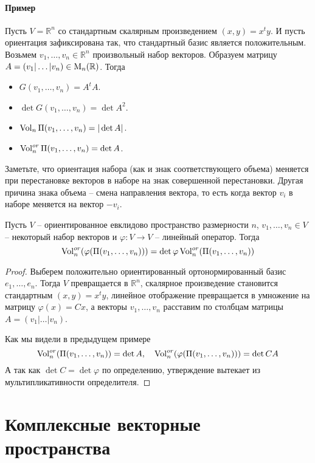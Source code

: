 \paragraph{Пример}

Пусть $V = \mathbb R^n$ со стандартным скалярным произведением $(x, y) = x^t y$.
И пусть ориентация зафиксирована так, что стандартный базис является положительным.
Возьмем $v_1,\ldots,v_n\in \mathbb R^n$ произвольный набор векторов.
Образуем матрицу $A = (v_1|\ldots|v_n)\in \operatorname{M}_{n}(\mathbb R)$.
Тогда 
\begin{itemize}
\item $G(v_1,\ldots,v_n) = A^t A$.

\item $\det G(v_1,\ldots,v_n) = \det A^2$.

\item $\operatorname{Vol}_n\Pi(v_1,\ldots,v_n) = |\det A|$.

\item $\operatorname{Vol}^{or}_n\Pi(v_1,\ldots,v_n) = \det A$.
\end{itemize}
Заметьте, что ориентация набора (как и знак соответствующего объема) меняется при перестановке векторов в наборе на знак совершенной перестановки.
Другая причина знака объема -- смена направления вектора, то есть когда вектор $v_i$ в наборе меняется на вектор $-v_i$.

\begin{claim}
Пусть $V$ -- ориентированное евклидово пространство размерности $n$, $v_1,\ldots,v_n\in V$ -- некоторый набор векторов и $\varphi\colon V\to V$ -- линейный оператор.
Тогда 
\[
\operatorname{Vol}^{or}_n(\varphi(\Pi(v_1,\ldots,v_n))) = \det \varphi \operatorname{Vol}^{or}_n(\Pi(v_1,\ldots,v_n))
\]
\end{claim}
\begin{proof}
Выберем положительно ориентированный ортонормированный базис $e_1,\ldots,e_n$.
Тогда $V$ превращается в $\mathbb R^n$, скалярное произведение становится стандартным $(x, y) = x^t y$, линейное отображение превращается в умножение на матрицу $\varphi(x) = Cx$, а векторы $v_1,\ldots,v_n$ расставим по столбцам матрицы $A = (v_1|\ldots|v_n)$.

Как мы видели в предыдущем примере
\[
\operatorname{Vol}^{or}_n(\Pi(v_1,\ldots,v_n)) = \det A,\quad
\operatorname{Vol}^{or}_n(\varphi(\Pi(v_1,\ldots,v_n))) = \det CA
\]
А так как $\det C = \det \varphi$ по определению, утверждение вытекает из мультипликативности определителя.
\end{proof}


\newpage
\section{Комплексные векторные пространства}

